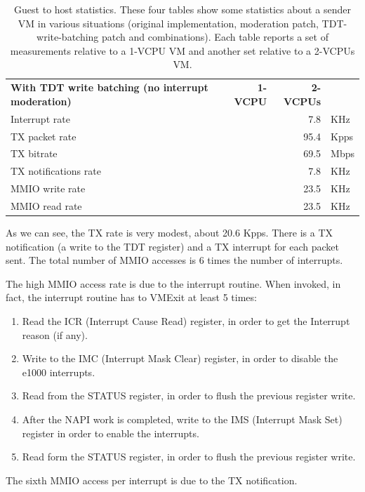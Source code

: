 \begin{table}
\begin{center}
\begin{tabular}{lrrl}
\bottomrule
\\
\toprule
\textbf{With TDT write batching (no interrupt moderation)} & \textbf{1-VCPU} & \textbf{2-VCPUs} &\\
\midrule
Interrupt rate & & 7.8 & KHz\\
TX packet rate & & 95.4 & Kpps\\
TX bitrate & & 69.5 & Mbps\\
TX notifications rate & & 7.8 & KHz\\
MMIO write rate& & 23.5 & KHz\\
MMIO read rate & & 23.5 & KHz\\
\bottomrule
\end{tabular}
\end{center}
\caption{Guest to host statistics. These four tables show some statistics about a sender VM in various situations (original implementation,
	 moderation patch, TDT-write-batching patch and combinations). Each table reports a set of measurements relative to a 1-VCPU VM
	and another set relative to a 2-VCPUs VM.}
\label{tab:e1000-tx-g2h1vcpu}
\end{table}

As we can see, the TX rate is very modest, about 20.6 Kpps. There is a TX notification (a write to the TDT register) and a TX interrupt for 
each packet sent. The total number of MMIO accesses is 6 times the number of interrupts.

The high MMIO access rate is due to the interrupt routine. 
When invoked, in fact, the interrupt routine has to VMExit at least 5 times:
\begin{enumerate}
    \item Read the ICR (Interrupt Cause Read) register, in order to get the Interrupt reason (if any).
    \item Write to the IMC (Interrupt Mask Clear) register, in order to disable the e1000 interrupts.
    \item Read from the STATUS register, in order to flush the previous register write.
    \item After the NAPI work is completed, write to the IMS (Interrupt Mask Set) register in order to enable the interrupts.
    \item Read form the STATUS register, in order to flush the previous register write.
\end{enumerate}

The sixth MMIO access per interrupt is due to the TX notification.

\vspace{0.5cm}

